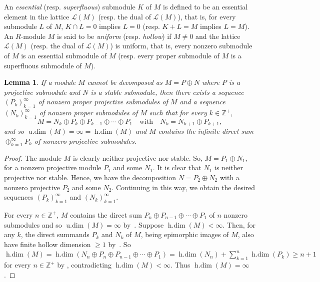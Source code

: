 \documentclass[11pt,a4paper]{amsart}
\theoremstyle{plain}
\newtheorem{lemma}[theorem]{Lemma}
\theoremstyle{definition}
\theoremstyle{remark}
\newcommand{\Z}{{\mathbb{Z}}}
\newcommand{\udim}{\operatorname{u.dim}}
\newcommand{\hdim}{\operatorname{h.dim}}
\begin{document}
An \emph{essential} (resp. \emph{superfluous}) submodule $K$ of  $M$ is defined to be an essential element in the lattice $\mathcal{L}(M)$ (resp. the dual of $\mathcal{L}(M)$), that is, for every submodule $L$ of $ M$, $K\cap L=0$ implies $L=0$ (resp. $K+L=M$ implies $L=M$). An $R$-module $M$ is said to be \emph{uniform} (resp. \emph{hollow}) if $M\neq 0$ and the lattice $\mathcal{L}(M)$ (resp. the dual of $\mathcal{L}(M)$) is uniform, that is, every nonzero submodule of $ M $ is an  essential submodule of $ M $ (resp. every proper submodule of $M$ is a superfluous submodule of $M$).

\begin{lemma}\label{decompositiontheorem} If a module $M$ cannot be decomposed as $M=P \oplus N$ where $P$ is a projective submodule and $N$ is a stable submodule, then there exists a sequence $(P_{k})_{k=1}^{\infty}$ of nonzero proper projective submodules of $M$ and a sequence $(N_{k})_{k=1}^{\infty}$ of nonzero proper submodules of $M$ such that for every $k\in \Z^{+}$, \[M=N_{k}\oplus P_{k}\oplus P_{k-1}\oplus \cdots \oplus P_{1}\quad \text{with}\quad N_{k}=N_{k+1}\oplus P_{k+1},\] and so $\udim(M)=\infty=\hdim(M)$ and $ M $ contains the infinite direct sum $ \displaystyle\oplus_{k=1}^\infty P_k $ of nonzero projective submodules.
\end{lemma}
\begin{proof}
The module $M$ is clearly neither projective nor stable. So, $M=P_1 \oplus N_1$, for a nonzero projective module $P_1$ and some $N_1$. It is clear that $N_1$ is neither projective nor stable. Hence, we have the decomposition $N=P_2 \oplus N_2$ with a nonzero projective $P_2$ and some $N_2$. Continuing in this way, we obtain the desired sequences $\left(P_k\right)_{k=1}^{\infty}$ and $\left(N_k\right)_{k=1}^{\infty}$.

For every $n \in \Z^{+}$, $ M $ contains the direct sum $ P_n\oplus P_{n-1}\oplus \cdots \oplus P_1 $ of $ n $ nonzero submodules and so $ \udim(M)=\infty $ by~\cite[6.6]{Lam:LecturesOnModulesAndRings}. Suppose $\hdim(M)<\infty$. Then, for any $ k $, the direct summands $ P_k$ and $ N_k $ of $ M $, being epimorphic images of $ M $, also have finite hollow dimension $ \geq 1 $ by~\cite[Proposition 2.42-(a,c)]{Facchini:ModuleTheory}. So $\hdim(M)= \hdim(N_n\oplus P_n\oplus P_{n-1}\oplus \cdots \oplus P_1)=\hdim (N_n)+\sum_{k=1}^n \hdim(P_k)\geq n+1$ for every $ n\in\Z^+ $ by \cite[Proposition 2.42-(e)]{Facchini:ModuleTheory}, contradicting $ \hdim(M)<\infty $. Thus $\hdim(M)=\infty$.
\end{proof}
\end{document}

